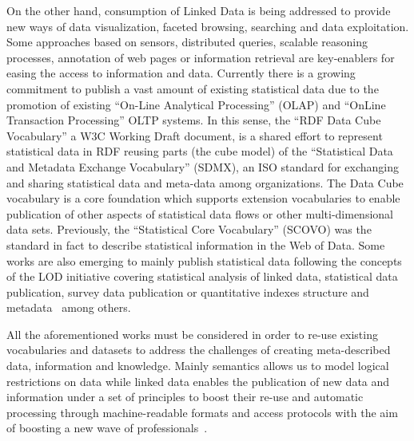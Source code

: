 On the other hand, consumption of Linked Data is being addressed to provide new ways of data 
visualization, faceted browsing, searching and data exploitation. Some approaches 
based on sensors, distributed queries, scalable reasoning processes, annotation of web pages 
or information retrieval are key-enablers for easing the access to information and data. Currently there is a growing commitment to publish a vast amount of existing statistical data due to 
the promotion of existing ``On-Line Analytical Processing'' (OLAP) and ``OnLine Transaction Processing'' OLTP systems. 
In this sense, the ``RDF Data Cube Vocabulary'' a W3C Working Draft document, is a shared effort to 
represent statistical data in RDF reusing parts (the cube model) of the ``Statistical Data and Metadata Exchange Vocabulary'' (SDMX), an ISO standard 
for exchanging and sharing statistical data and meta-data among organizations. The Data Cube vocabulary is a core 
foundation which supports extension vocabularies to enable publication of other aspects of statistical data flows or 
other multi-dimensional data sets. Previously, the ``Statistical Core Vocabulary'' (SCOVO) was the standard in 
fact to describe statistical information in the Web of Data. Some works are also emerging to mainly publish statistical data 
following the concepts of the LOD initiative covering statistical analysis of linked data, statistical 
data publication, survey data publication or quantitative indexes structure and metadata~\cite{webindexlod} among others.

All the aforementioned works must be considered in order to re-use existing vocabularies and datasets to address 
the challenges of creating meta-described data, information and knowledge. Mainly semantics allows us to model logical restrictions 
on data while linked data enables the publication of new data and information under a set of principles 
to boost their re-use and automatic processing through machine-readable formats and access protocols with the aim of boosting 
a new wave of professionals~\cite{DBLP:journals/ijhcitp/PalaciosSAG12}.


